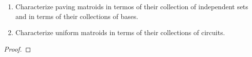 \prob
{   $\,$\pn
    \begin{enumerate}[label=(\roman*)]
        \item   Characterize paving matroids in termos of their collection of independent sets and in 
                terms of their collections of bases.
        \item   Characterize uniform matroids in terms of their collections of circuits.
    \end{enumerate}
}
\begin{proof}
\end{proof}